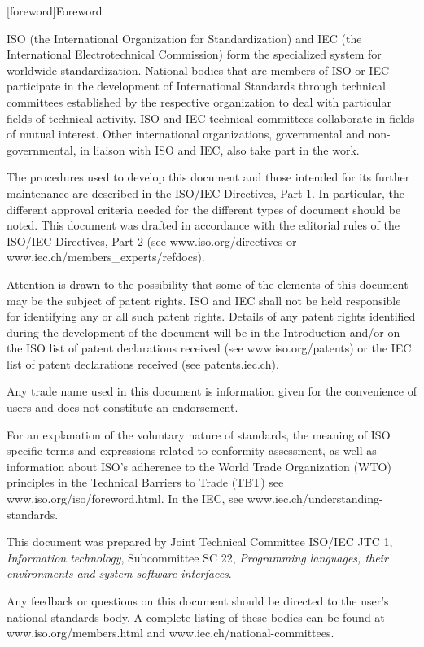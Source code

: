 
[foreword]{Foreword}

ISO (the International Organization for Standardization) and IEC (the International Electrotechnical Commission) form the specialized system for worldwide standardization. National bodies that are members of ISO or IEC participate in the development of International Standards through technical committees established by the respective organization to deal with particular fields of technical activity. ISO and IEC technical committees collaborate in fields of mutual interest. Other international organizations, governmental and non-governmental, in liaison with ISO and IEC, also take part in the work.

The procedures used to develop this document and those intended for its further maintenance are described in the ISO/IEC Directives, Part 1. In particular, the different approval criteria needed for the different types of document should be noted. This document was drafted in accordance with the editorial rules of the ISO/IEC Directives, Part 2
(see www.iso.org/directives or www.iec.ch/members_experts/refdocs).

Attention is drawn to the possibility that some of the elements of this document may be the subject of patent rights. ISO and IEC shall not be held responsible for identifying any or all such patent rights. Details of any patent rights identified during the development of the document will be in the Introduction and/or on the ISO list of patent declarations received (see www.iso.org/patents) or the IEC list of patent declarations received (see patents.iec.ch).

Any trade name used in this document is information given for the convenience of users and does not constitute an endorsement.

For an explanation of the voluntary nature of standards, the meaning of ISO specific terms and expressions related to conformity assessment, as well as information about ISO's adherence to the World Trade Organization (WTO) principles in the Technical Barriers to Trade (TBT) see www.iso.org/iso/foreword.html. In the IEC, see www.iec.ch/understanding-standards.

This document was prepared by Joint Technical Committee ISO/IEC JTC 1, \textit{Information technology}, Subcommittee SC 22, \textit{Programming languages, their environments and system software interfaces}.

Any feedback or questions on this document should be directed to the user’s national standards body. A complete listing of these bodies can be found
at www.iso.org/members.html and www.iec.ch/national-committees.
